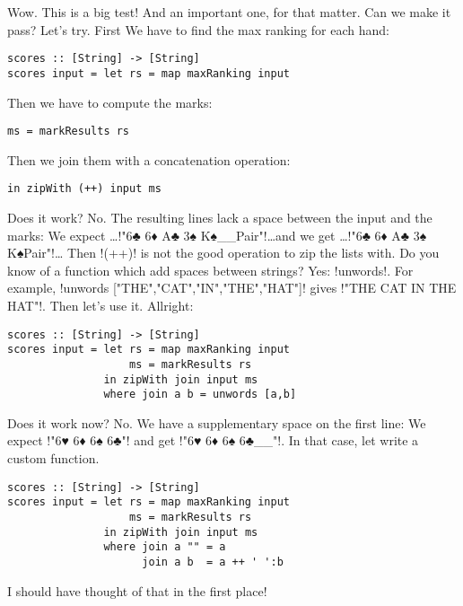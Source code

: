 \lhA Wow. This is a big test!
\lhN And an important one, for that matter. Can we make it pass?
\lhA Let's try. First We have to find the max ranking for each hand:
\begin{lstlisting}[frame=single]
scores :: [String] -> [String]
scores input = let rs = map maxRanking input
\end{lstlisting}
Then we have to compute the marks:
\begin{lstlisting}[frame=single]
                   ms = markResults rs
\end{lstlisting}
Then we join them with a concatenation operation:
\begin{lstlisting}[frame=single]
               in zipWith (++) input ms
\end{lstlisting}
\failure Does it work?
\lhN No. The resulting lines lack a space between the input and the marks:
We expect \dots\il!"6♣ 6♦ A♣ 3♠ K♠__Pair"!\dots and we get \dots\il!"6♣ 6♦ A♣ 3♠ K♠Pair"!\dots 
\lhA \failure Then \il!(++)! is not the good operation to zip the lists with.
\lhN Do you know of a function which add spaces between strings?
\lhA Yes: \il!unwords!. For example, \il!unwords ["THE","CAT","IN","THE","HAT"]! gives \il!"THE CAT IN THE HAT"!.
\lhN Then let's use it.
\lhA Allright:
\begin{lstlisting}[frame=single]
scores :: [String] -> [String]
scores input = let rs = map maxRanking input
                   ms = markResults rs
               in zipWith join input ms
               where join a b = unwords [a,b]
\end{lstlisting}
\failure Does it work now?
\lhN No. We have a supplementary space on the first line:
We expect \il!"6♥ 6♦ 6♠ 6♣"! and get \il!"6♥ 6♦ 6♠ 6♣__"!.
\lhA \failure In that case, let write a custom function.
\begin{lstlisting}[frame=single]
scores :: [String] -> [String]
scores input = let rs = map maxRanking input
                   ms = markResults rs
               in zipWith join input ms
               where join a "" = a
                     join a b  = a ++ ' ':b
\end{lstlisting}
\success I should have thought of that in the first place!
\lhend
